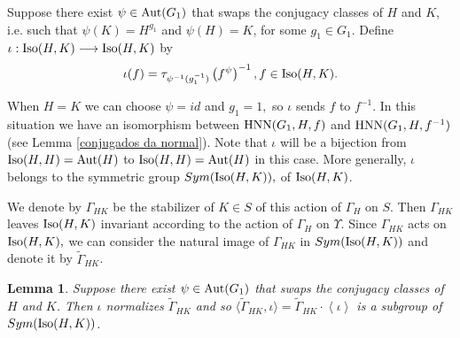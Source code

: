\documentclass[a4paper,12pt]{article}
\newtheorem{lem}[thm]{Lemma}
\def\aut {{\rm Aut}}
\def\hnn {{\rm HNN}}
\def\Iso {{\rm Iso}}
\begin{document}
{Suppose there exist $\psi \in \aut(G_1)$ that swaps the conjugacy classes of $H$ and $K$, i.e. such that $\psi(K)=H^{g_1}$ and $\psi(H)=K$, for some $g_1\in G_1$.  Define $\iota: \Iso(H,K) \longrightarrow \Iso(H,K)$ by \begin{equation} \label{def iota abst} \iota(f)=\tau_{\psi^{-1}(g_1^{-1})}\left(f^{\psi}\right)^{-1}, f \in \Iso(H,K).\end{equation} 



When $H=K$ we can choose $\psi=id$ and $g_1=1,$ so $\iota$ sends $f$ to $f^{-1}.$ In this situation we have an isomorphism between $\hnn(G_1,H,f)$ and $\hnn(G_1,H,f^{-1})$ (see Lemma \ref{conjugados da normal}). Note that $\iota$ will be a bijection from $\Iso(H, H)=\aut(H)$ to $\Iso(H, H)=\aut(H)$ in this case. More generally, $\iota$ belongs to the symmetric group $Sym(\Iso(H, K)),$ of $\Iso(H, K)$. 



We denote by $\Gamma_{HK}$ be the stabilizer of $K\in S$ of this action of $\Gamma_H$ on $S$. Then $\Gamma_{HK}$ leaves $\Iso(H, K)$ invariant according to the action of $\Gamma_H$ on $\Upsilon$.  
Since $\Gamma_{HK}$ acts on $\Iso(H, K),$ we can consider the natural image of $\Gamma_{HK}$ in $Sym(\Iso(H, K))$ and denote it by $\widetilde\Gamma_{HK}$.






\begin{lem} \label{semidiretocomC2} Suppose there exist $\psi \in \aut(G_1)$ that swaps the conjugacy classes of $H$ and $K$.  Then $\iota $ normalizes $\widetilde\Gamma_{HK}$ and so $\langle \widetilde\Gamma_{HK}, \iota  \rangle=\widetilde\Gamma_{HK} \cdot  \left\langle  \iota \right\rangle$ is a subgroup of $Sym(\Iso(H, K))$. \end{lem}  

}
\end{document}
